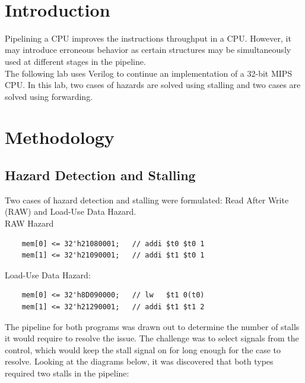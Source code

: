 \documentclass[twocolumn]{article}
\begin{document}
\

{\newpage}

\maketitle        


\section{Introduction}

Pipelining a CPU improves the instructions throughput in a CPU. However, it may introduce erroneous behavior as certain structures may be simultaneously used at different stages in the pipeline.\\

The following lab uses Verilog to continue an implementation of a 32-bit MIPS CPU. In this lab, two cases of hazards are solved using stalling and two cases are solved using forwarding.
\section{Methodology}

\subsection{Hazard Detection and Stalling}

Two cases of hazard detection and stalling were formulated: Read After Write (RAW) and Load-Use Data Hazard.\\

RAW Hazard
\begin{lstlisting}
    mem[0] <= 32'h21080001;   // addi $t0 $t0 1
    mem[1] <= 32'h21090001;   // addi $t1 $t0 1
\end{lstlisting}
\medskip
Load-Use Data Hazard:
\begin{lstlisting}
    mem[0] <= 32'h8D090000;   // lw   $t1 0(t0)
    mem[1] <= 32'h21290001;   // addi $t1 $t1 2
\end{lstlisting}
\medskip
The pipeline for both programs was drawn out to determine the number of stalls it would require to resolve the issue. The challenge was to select signals from the control, which would keep the stall signal on for long enough for the case to resolve. Looking at the diagrams below, it was discovered that both types required two stalls in the pipeline: 
\end{document}
